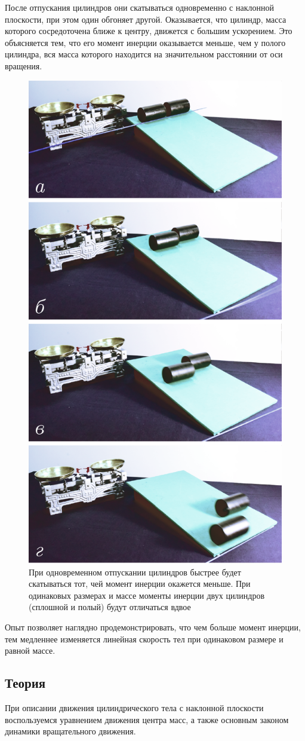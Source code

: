 \documentclass[All.tex]{subfiles}
\begin{document}
	После отпускания цилиндров они скатываться одновременно с наклонной плоскости, при этом один обгоняет другой. Оказывается, что цилиндр, масса которого сосредоточена ближе к центру, движется с большим ускорением. Это объясняется тем, что его момент инерции оказывается меньше, чем у полого цилиндра, вся масса которого находится на значительном расстоянии от оси вращения.
	
	\begin{figure}[H] 	
		\centering 	
		\includegraphics[width=0.5\linewidth]{inclinedplane-2.png}
		\caption{При одновременном отпускании цилиндров быстрее будет скатываться тот, чей момент инерции окажется меньше. При одинаковых размерах и массе моменты инерции двух цилиндров (сплошной и полый) будут отличаться вдвое}
		\label{inclinedplane-2}
	\end{figure}

	Опыт позволяет наглядно продемонстрировать, что чем больше момент инерции, тем медленнее изменяется линейная скорость тел при одинаковом размере и равной массе.
	
	\subsection*{\textcolor{PineGreen}{Теория}}
	
	При описании движения цилиндрического тела с наклонной плоскости воспользуемся уравнением движения центра масс, а также основным законом динамики вращательного движения.
	
\end{document}
